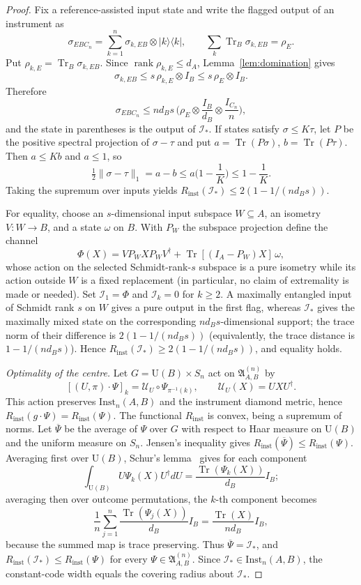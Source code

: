 \documentclass[11pt,a4paper]{article}
\newcommand{\Inst}{\mathrm{Inst}}
\newcommand{\Tr}{\operatorname{Tr}}
\newcommand{\rank}{\operatorname{rank}}
\begin{document}
\begin{proof}
Fix a reference-assisted input state and write the flagged output of an instrument as
\[
\sigma_{EBC_n}=\sum_{k=1}^n\sigma_{k,EB}\otimes|k\rangle\langle k|,\qquad
\sum_k\Tr_B\sigma_{k,EB}=\rho_E.
\]
Put $\rho_{k,E}=\Tr_B\sigma_{k,EB}$. Since $\rank\rho_{k,E}\le d_A$, Lemma~\ref{lem:domination} gives
\[
\sigma_{k,EB}\le s\,\rho_{k,E}\otimes I_B\le s\,\rho_E\otimes I_B.
\]
Therefore
\[
\sigma_{EBC_n}\le nd_Bs\,\Big(\rho_E\otimes\frac{I_B}{d_B}\otimes\frac{I_{C_n}}n\Big),
\]
and the state in parentheses is the output of $\mathcal I_*$. If states satisfy $\sigma\le K\tau$, let $P$ be the positive spectral projection of $\sigma-\tau$ and put $a=\Tr(P\sigma)$, $b=\Tr(P\tau)$. Then $a\le Kb$ and $a\le1$, so
\[
\tfrac12\|\sigma-\tau\|_1=a-b\le a\Big(1-\frac1K\Big)\le1-\frac1K.
\]
Taking the supremum over inputs yields $R_{\mathrm{inst}}(\mathcal I_*)\le2(1-1/(nd_Bs))$.

For equality, choose an $s$-dimensional input subspace $W\subseteq A$, an isometry $V:W\to B$, and a state $\omega$ on $B$. With $P_W$ the subspace projection define the channel
\[
\Phi(X)=VP_WXP_WV^\dagger+\Tr[(I_A-P_W)X]\,\omega,
\]
whose action on the selected Schmidt-rank-$s$ subspace is a pure isometry while its action outside $W$ is a fixed replacement (in particular, no claim of extremality is made or needed). Set $\mathcal I_1=\Phi$ and $\mathcal I_k=0$ for $k\ge2$. A maximally entangled input of Schmidt rank $s$ on $W$ gives a pure output in the first flag, whereas $\mathcal I_*$ gives the maximally mixed state on the corresponding $nd_Bs$-dimensional support; the trace norm of their difference is $2(1-1/(nd_Bs))$ (equivalently, the trace distance is $1-1/(nd_Bs)$). Hence $R_{\mathrm{inst}}(\mathcal I_*)\ge2(1-1/(nd_Bs))$, and equality holds.

\emph{Optimality of the centre.} Let $G=\mathrm U(B)\times S_n$ act on $\mathfrak A_{A,B}^{(n)}$ by
\[
[(U,\pi)\cdot\Psi]_k=\mathcal U_U\circ\Psi_{\pi^{-1}(k)},
\qquad \mathcal U_U(X)=UXU^\dagger.
\]
This action preserves $\Inst_n(A,B)$ and the instrument diamond metric, hence $R_{\mathrm{inst}}(g\cdot\Psi)=R_{\mathrm{inst}}(\Psi)$. The functional $R_{\mathrm{inst}}$ is convex, being a supremum of norms. Let $\overline\Psi$ be the average of $\Psi$ over $G$ with respect to Haar measure on $\mathrm U(B)$ and the uniform measure on $S_n$. Jensen's inequality gives $R_{\mathrm{inst}}(\overline\Psi)\le R_{\mathrm{inst}}(\Psi)$. Averaging first over $\mathrm U(B)$, Schur's lemma~\cite{Watrous2018} gives for each component
\[
\int_{\mathrm U(B)}U\Psi_k(X)U^\dagger dU=\frac{\Tr(\Psi_k(X))}{d_B}I_B;
\]
averaging then over outcome permutations, the $k$-th component becomes
\[
\frac1n\sum_{j=1}^n\frac{\Tr(\Psi_j(X))}{d_B}I_B
=\frac{\Tr(X)}{nd_B}I_B,
\]
because the summed map is trace preserving. Thus $\overline\Psi=\mathcal I_*$, and $R_{\mathrm{inst}}(\mathcal I_*)\le R_{\mathrm{inst}}(\Psi)$ for every $\Psi\in\mathfrak A_{A,B}^{(n)}$. Since $\mathcal I_*\in\Inst_n(A,B)$, the constant-code width equals the covering radius about $\mathcal I_*$.
\end{proof}
\end{document}
